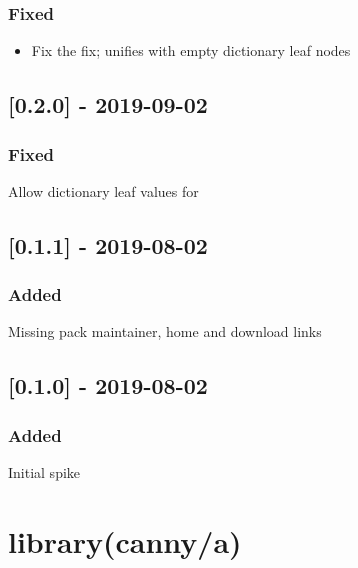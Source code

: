 \subsection{Fixed}

\begin{itemize}
    \item Fix the fix;  unifies with empty dictionary leaf nodes
\end{itemize}

\section{[0.2.0] - 2019-09-02}

\subsection{Fixed}

\begin{shortlist}
    \item Allow dictionary leaf values for 
\end{shortlist}

\section{[0.1.1] - 2019-08-02}

\subsection{Added}

\begin{shortlist}
    \item Missing pack maintainer, home and download links
\end{shortlist}

\section{[0.1.0] - 2019-08-02}

\subsection{Added}

\begin{shortlist}
    \item Initial spike
\end{shortlist}

\chapter{library(canny/a)}\label{sec:a}

